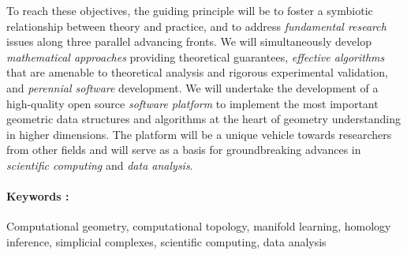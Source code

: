 To reach these objectives, the guiding principle will be to foster a
symbiotic relationship between theory and practice, and to address
{\em fundamental research} issues along three parallel advancing
fronts. We will simultaneously develop {\em mathematical approaches}
providing theoretical guarantees, {\em effective algorithms} that are
amenable to theoretical analysis and rigorous experimental validation,
and {\em perennial software} development.  We will undertake the
development of a high-quality open source {\em software platform} to
implement the most important geometric data structures and algorithms
at the heart of geometry understanding in higher dimensions. The
platform will be a unique vehicle towards researchers from other
fields and will serve as a basis for groundbreaking advances in {\em
  scientific computing} and {\em data analysis}.



\paragraph{Keywords :} Computational geometry, computational topology,
manifold learning, homology inference, simplicial complexes,
scientific computing, data analysis